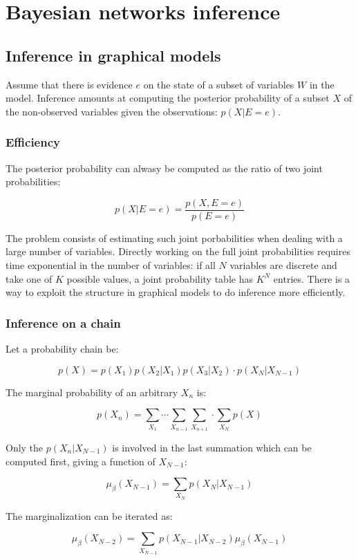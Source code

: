 \chapter{Bayesian networks inference}

\section{Inference in graphical models}
Assume that there is evidence $e$ on the state of a subset of variables $W$ in the model.
Inference amounts at computing the posterior probability of a subset $X$ of the non-observed variables given the observations: $p(X|E=e)$.

	\subsection{Efficiency}
	The posterior probability can alwasy be computed as the ratio of two joint probabilities:

	$$p(X|E=e)=\frac{p(X,E=e)}{p(E=e)}$$

	The problem consists of estimating such joint porbabilities when dealing with a large number of variables.
	Directly working on the full joint probabilities requires time exponential in the number of variables: if all $N$ variables are discrete and take one of $K$ possible values, a joint probability table has $K^N$ entries.
	There is a way to exploit the structure in graphical models to do inference more efficiently.

	\subsection{Inference on a chain}
	Let a probability chain be:

	$$p(X) = p(X_1)p(X_2|X_1)p(X_3|X_2)\cdot p(X_N|X_{N-1})$$

	The marginal probability of an arbitrary $X_n$ is:

	$$p(X_n) = \sum\limits_{X_1}\cdots\sum\limits_{X_{n-1}}\sum\limits_{X_{n+1}}\cdot\sum\limits_{X_{N}}p(X)$$

	Only the $p(X_n|X_{N-1})$ is involved in the last summation which can be computed first, giving a function of $X_{N-1}$:

	$$\mu_\beta(X_{N-1}) = \sum\limits_{X_N}p(X_N|X_{N-1})$$

	The marginalization can be iterated as:

	$$\mu_\beta(X_{N-2}) = \sum\limits_{X_{N-1}}p(X_{N-1}|X_{N-2})\mu_\beta(X_{N-1})$$

